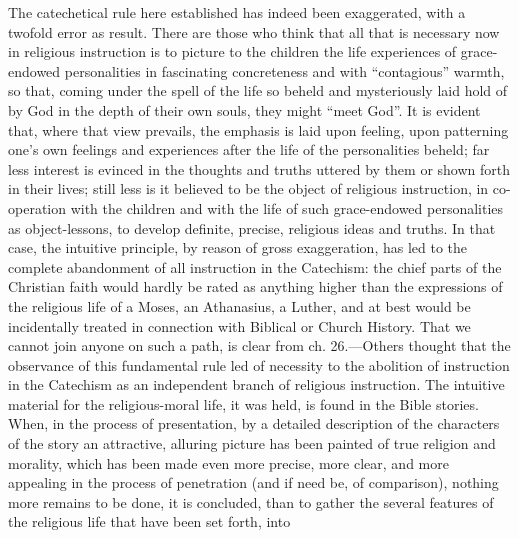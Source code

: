 The catechetical rule here established has indeed been exaggerated, with a twofold error as result. There are
those who think that all that is necessary now in religious instruction is to picture to the children the life experiences of grace-endowed personalities in fascinating concreteness and with “contagious” warmth, so that, coming under the spell of the life so beheld and mysteriously laid hold of by God in the depth of their own souls, they might “meet God”. It is evident that, where that view prevails, the emphasis is laid upon feeling, upon patterning one’s own feelings and experiences after the life of the personalities beheld; far less interest is evinced in the thoughts and truths uttered by them or shown forth in their lives; still less is it believed to be the object of religious instruction, in co-operation with the children and with the life of such grace-endowed personalities as object-lessons, to develop definite, precise, religious ideas and truths. In that case, the intuitive principle, by reason of gross exaggeration, has led to the complete abandonment of all instruction in the Catechism: the chief parts of the Christian faith would hardly be rated as anything higher than the expressions of the religious life of a Moses, an Athanasius, a Luther, and at best would be incidentally treated in connection with Biblical or Church History. That we cannot join anyone on such a path, is clear from ch. 26.—Others thought that the observance of this fundamental rule led of necessity to the abolition of instruction in the Catechism as an independent branch of religious instruction. The intuitive material for the religious-moral life, it was held, is found in the Bible stories. When, in the process of presentation, by a detailed description of the characters of the story an attractive, alluring picture has been painted of true religion and morality, which has been made even more precise, more clear, and more appealing in the process of penetration (and if need be, of comparison), nothing more remains to be done, it is concluded, than to gather the several features of the religious life that have been set forth, into

